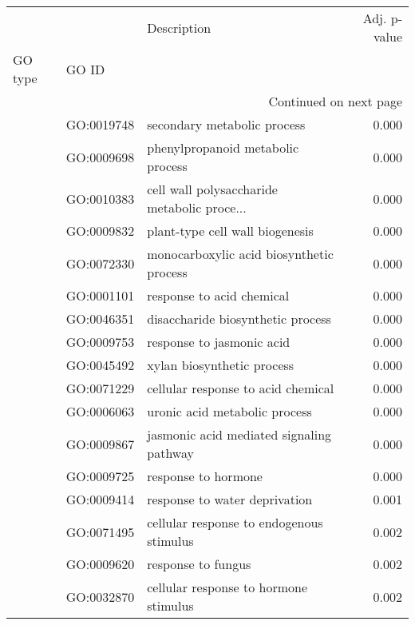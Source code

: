 \begin{longtable}{lllr}
\toprule
   &            &                                  Description &  Adj. p-value \\
GO type & GO ID &                                              &               \\
\midrule
\endhead
\midrule
\multicolumn{4}{r}{{Continued on next page}} \\
\midrule
\endfoot

\bottomrule
\endlastfoot
\multirow{103}{*}{BP} & GO:0019748 &                  secondary metabolic process &         0.000 \\
   & GO:0009698 &            phenylpropanoid metabolic process &         0.000 \\
   & GO:0010383 &  cell wall polysaccharide metabolic proce... &         0.000 \\
   & GO:0009832 &              plant-type cell wall biogenesis &         0.000 \\
   & GO:0072330 &     monocarboxylic acid biosynthetic process &         0.000 \\
   & GO:0001101 &                    response to acid chemical &         0.000 \\
   & GO:0046351 &            disaccharide biosynthetic process &         0.000 \\
   & GO:0009753 &                    response to jasmonic acid &         0.000 \\
   & GO:0045492 &                   xylan biosynthetic process &         0.000 \\
   & GO:0071229 &           cellular response to acid chemical &         0.000 \\
   & GO:0006063 &                uronic acid metabolic process &         0.000 \\
   & GO:0009867 &     jasmonic acid mediated signaling pathway &         0.000 \\
   & GO:0009725 &                          response to hormone &         0.000 \\
   & GO:0009414 &                response to water deprivation &         0.001 \\
   & GO:0071495 &     cellular response to endogenous stimulus &         0.002 \\
   & GO:0009620 &                           response to fungus &         0.002 \\
   & GO:0032870 &        cellular response to hormone stimulus &         0.002 \\

\end{longtable}
